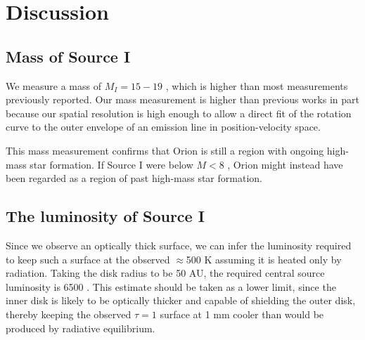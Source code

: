 \documentclass[twocolumn]{aastex61}
\begin{document}
% 
% 


\section{Discussion}
\subsection{Mass of Source I}
We measure a mass of $M_I=15-19$ \msun, which is higher than most measurements
previously reported.  Our mass measurement is higher than previous works
in part because our spatial resolution is high enough to allow a direct fit of
the rotation curve to the outer envelope of an emission line in
position-velocity space.

This mass measurement confirms that Orion is still a region with ongoing
high-mass star formation.  If Source I were below $M<8$ \msun, Orion might
instead have been regarded as a region of past high-mass star formation.

\subsection{The luminosity of Source I}
Since we observe an optically thick surface, we can infer the luminosity
required to keep such a surface at the observed $\approx$500 K assuming
it is heated only by radiation.  Taking the disk radius to be 50 AU,
the required central source luminosity is 6500 \lsun.  This estimate
should be taken as a lower limit, since the inner disk is likely to be
optically thicker and capable of shielding the outer disk, thereby
keeping the observed $\tau=1$ surface at 1 mm cooler than would
be produced by radiative equilibrium.
\end{document}
